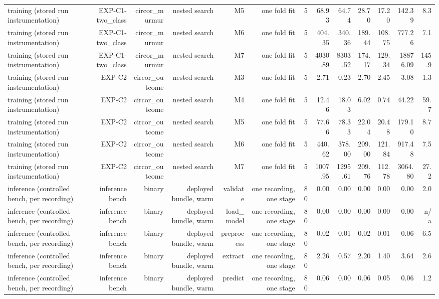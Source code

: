 \begin{table}[htbp]
\begin{tabular}{lrrrrrrrrrrrr}
    training (stored run instrumentation) & EXP-C1-two\_class & circor\_murmur & nested search & M5 & one fold fit & 5 & 68.93 & 64.74 & 28.70 & 17.20 & 142.39 & 8.3 \\
    training (stored run instrumentation) & EXP-C1-two\_class & circor\_murmur & nested search & M6 & one fold fit & 5 & 404.35 & 340.36 & 189.44 & 108.75 & 777.26 & 7.1 \\
    training (stored run instrumentation) & EXP-C1-two\_class & circor\_murmur & nested search & M7 & one fold fit & 5 & 4030.89 & 8303.52 & 174.17 & 129.34 & 18876.09 & 145.9 \\
    training (stored run instrumentation) & EXP-C2 & circor\_outcome & nested search & M3 & one fold fit & 5 & 2.71 & 0.23 & 2.70 & 2.45 & 3.08 & 1.3 \\
    training (stored run instrumentation) & EXP-C2 & circor\_outcome & nested search & M4 & one fold fit & 5 & 12.46 & 18.03 & 6.02 & 0.74 & 44.22 & 59.7 \\
    training (stored run instrumentation) & EXP-C2 & circor\_outcome & nested search & M5 & one fold fit & 5 & 77.66 & 78.33 & 22.04 & 20.48 & 179.10 & 8.7 \\
    training (stored run instrumentation) & EXP-C2 & circor\_outcome & nested search & M6 & one fold fit & 5 & 440.62 & 378.00 & 209.00 & 121.84 & 917.48 & 7.5 \\
    training (stored run instrumentation) & EXP-C2 & circor\_outcome & nested search & M7 & one fold fit & 5 & 1007.95 & 1295.61 & 209.76 & 112.78 & 3064.80 & 27.2 \\
    inference (controlled bench, per recording) & inference bench & binary & deployed bundle, warm & validate & one recording, one stage & 80 & 0.00 & 0.00 & 0.00 & 0.00 & 0.00 & 2.0 \\
    inference (controlled bench, per recording) & inference bench & binary & deployed bundle, warm & load\_model & one recording, one stage & 80 & 0.00 & 0.00 & 0.00 & 0.00 & 0.00 & n/a \\
    inference (controlled bench, per recording) & inference bench & binary & deployed bundle, warm & preprocess & one recording, one stage & 80 & 0.02 & 0.01 & 0.02 & 0.01 & 0.06 & 6.5 \\
    inference (controlled bench, per recording) & inference bench & binary & deployed bundle, warm & extract & one recording, one stage & 80 & 2.26 & 0.57 & 2.20 & 1.40 & 3.64 & 2.6 \\
    inference (controlled bench, per recording) & inference bench & binary & deployed bundle, warm & predict & one recording, one stage & 80 & 0.06 & 0.00 & 0.06 & 0.05 & 0.06 & 1.2 \\

\end{tabular}
\end{table}
